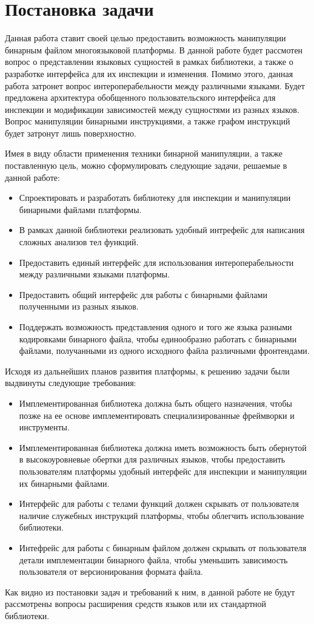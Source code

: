 \section{Постановка задачи}
\label{sec:Chapter1} 

\sloppy

Данная работа ставит своей целью предоставить возможность манипуляции бинарным файлом многоязыковой платформы. В данной работе будет рассмотен вопрос о представлении языковых сущностей в рамках библиотеки, а также о разработке интерфейса для их инспекции и изменения. Помимо этого, данная работа затронет вопрос интероперабельности между различными языками. Будет предложена архитектура обобщенного пользовательского интерфейса для инспекции и модификации зависимостей между сущностями из разных языков. Вопрос манипуляции бинарными инструкциями, а также графом инструкций будет затронут лишь поверхностно.

Имея в виду области применения техники бинарной манипуляции, а также поставленную цель, можно сформулировать следующие задачи, решаемые в данной работе:

\begin{itemize}
    \item Спроектировать и разработать библиотеку для инспекции и манипуляции бинарными файлами платформы.
    \item В рамках данной библиотеки реализовать удобный интрефейс для написания сложных анализов тел функций.
    \item Предоставить единый интерфейс для использования интероперабельности между различными языками платформы.
    \item Предоставить общий интерфейс для работы с бинарными файлами полученными из разных языков.
    \item Поддержать возможность представления одного и того же языка разными кодировками бинарного файла, чтобы единообразно работать с бинарными файлами, получанными из одного исходного файла различными фронтендами.
\end{itemize}

Исходя из дальнейших планов развития платформы, к решению задачи были выдвинуты следующие требования:

\begin{itemize}
    \item Имплементированная библиотека должна быть общего назначения, чтобы позже на ее основе имплементировать специализированные фреймворки и инструменты.
    \item Имплементированная библиотека должна иметь возможность быть обернутой в высокоуровневые обертки для различных языков, чтобы предоставить пользователям платформы удобный интерфейс для инспекции и манипуляции их бинарными файлами.
    \item Интерфейс для работы с телами функций должен скрывать от пользователя наличие служебных инструкций платформы, чтобы облегчить использование библиотеки.
    \item Интефрейс для работы с бинарным файлом должен скрывать от пользователя детали имплементации бинарного файла, чтобы уменьшить зависимость пользователя от версионирования формата файла.
\end{itemize}

Как видно из постановки задач и требований к ним, в данной работе не будут рассмотрены вопросы расширения средств языков или их стандартной библиотеки.

\newpage
